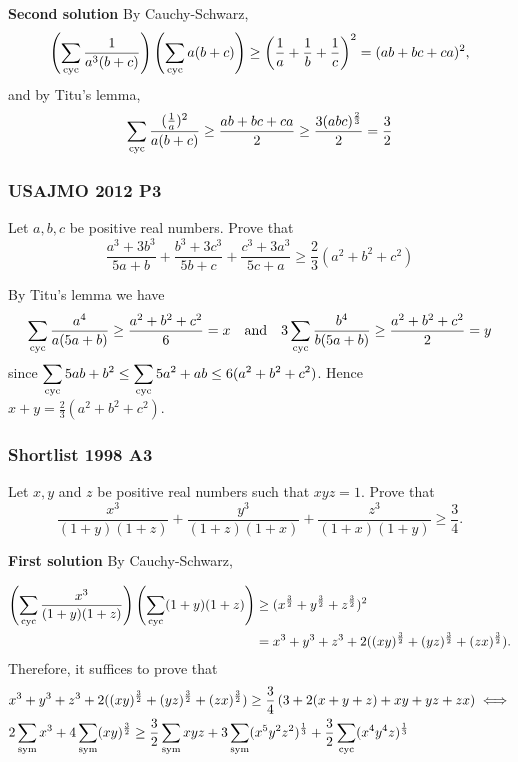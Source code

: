 \documentclass[12pt]{article}
\begin{document}
\textcolor{color1}{\textbf{Second solution}} By Cauchy-Schwarz,
\[
	\left(\sum_{\text{cyc}} \frac{1}{a^3(b+c)}\right)\left(\sum_{\text{cyc}} a(b+c)\right) \geq
	\left(\frac{1}{a} + \frac{1}{b} + \frac{1}{c}\right)^2 = (ab+bc+ca)^2,
\]
and by Titu's lemma,
\[
	\sum_{\text{cyc}} \frac{(\frac{1}{a})^2}{a(b+c)} \geq \frac{ab+bc+ca}{2} \ge \frac{3(abc)^{\frac{2}{3}}}{2} = \frac{3}{2}
\]
\clearpage

\subsubsection{USAJMO 2012 P3}

\begin{problem}
Let $a,b,c$ be positive real numbers. Prove that
\[
	\frac{a^3+3b^3}{5a+b}+\frac{b^3+3c^3}{5b+c}+\frac{c^3+3a^3}{5c+a} \geq \frac{2}{3}(a^2+b^2+c^2)
\]
\end{problem}

By Titu's lemma we have
\[
	\sum_{\text{cyc}} \frac{a^4}{a(5a+b)} \geq \frac{a^2+b^2+c^2}{6} = x \quad \text{and} \quad
	3 \sum_{\text{cyc}} \frac{b^4}{b(5a+b)} \geq \frac{a^2+b^2+c^2}{2} = y
\]
since $\displaystyle \sum_{\text{cyc}} 5ab+b^2 \leq \sum_{\text{cyc}} 5a^2+ab \leq 6(a^2+b^2+c^2)$. Hence $\displaystyle x+y=\frac{2}{3}(a^2+b^2+c^2)$.
\clearpage

\subsubsection{Shortlist 1998 A3}

\begin{problem}
Let $x,y$ and $z$ be positive real numbers such that $xyz=1$. Prove that
\[
	\frac{x^{3}}{(1 + y)(1 + z)}+\frac{y^{3}}{(1 + z)(1 + x)}+\frac{z^{3}}{(1 + x)(1 + y)}
	\geq \frac{3}{4}.
\]
\end{problem}

\textcolor{color1}{\textbf{First solution}} By Cauchy-Schwarz,

\begin{align*}
	\left(\sum_{\text{cyc}} \frac{x^3}{(1+y)(1+z)}\right)\left(\sum_{\text{cyc}} (1+y)(1+z)\right) & \geq (x^{\frac{3}{2}}
	+ y^{\frac{3}{2}} + z^{\frac{3}{2}})^2                                                       \\ & = x^3+y^3+z^3+2((xy)^{\frac{3}{2}}+(yz)^{\frac{3}{2}}+(zx)^{\frac{3}{2}}).
\end{align*}
Therefore, it suffices to prove that
\begin{align*}
	 & x^3+y^3+z^3+2((xy)^{\frac{3}{2}}+(yz)^{\frac{3}{2}}+(zx)^{\frac{3}{2}}) \geq \frac{3}{4}\left(3+2(x+y+z)+xy+yz+zx \right) \iff            \\
	 & 2 \sum_{\text{sym}} x^3 +4 \sum_{\text{sym}} (xy)^{\frac{3}{2}} \geq \frac{3}{2} \sum_{\text{sym}} xyz + 3 \sum_{\text{sym}}(x^5y^2z^2)^{\frac{1}{3}}+\frac{3}{2} \sum_{\text{cyc}}(x^4y^4z)^{\frac{1}{3}}
\end{align*}
\end{document}
